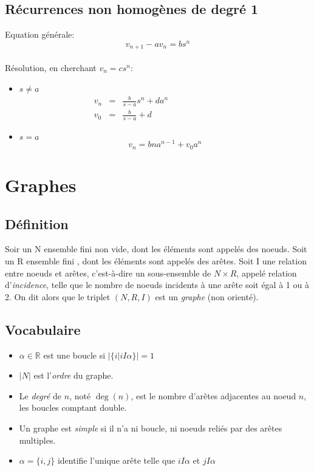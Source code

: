 \subsection{Récurrences non homogènes de degré 1}
Equation générale:
\[v_{n+1} - av_n = bs^n\]\\
Résolution, en cherchant $v_n = cs^n$:\\
\begin{itemize}
\item $s \neq a$
\begin{eqnarray*}
	v_n &=& \frac{b}{s - a}s^n + da^n \qquad{\qquad{\qquad{\qquad}}}\\
	v_0 &=& \frac{b}{s - a} + d
\end{eqnarray*}
\item $s = a$ \[v_n = bna^{n-1} + v_0a^n\]
\end{itemize}


\section{Graphes}

\subsection{Définition}
Soir un N ensemble fini non vide, dont  les éléments sont appelés des noeuds. Soit un R ensemble fini , dont les éléments sont appelés  des arêtes. Soit I une relation entre noeuds et arêtes, c'est-à-dire un sous-ensemble de $N \times R$, appelé relation d'\emph{incidence}, telle que le nombre de noeuds incidents à une arête soit égal à 1 ou à 2. On dit alors que le triplet $(N, R, I)$ est un \emph{graphe} (non orienté).

\subsection{Vocabulaire}
\begin{itemize}
\item $\alpha \in \mathbb{R}$ est une boucle si $|\{i|iI\alpha\}| = 1$\\
\item $|N|$ est l'\emph{ordre} du graphe.\\
\item Le \emph{degré} de $n$, noté $\deg(n)$, est le nombre d'arêtes adjacentes au noeud $n$, les boucles comptant double.\\
\item Un graphe est \emph{simple} si il n'a ni boucle, ni noeuds reliés par des arêtes multiples.\\
\item $\alpha = \{i, j\}$ identifie l'unique arête telle que $iI\alpha$ et $jI\alpha$
\end{itemize}
